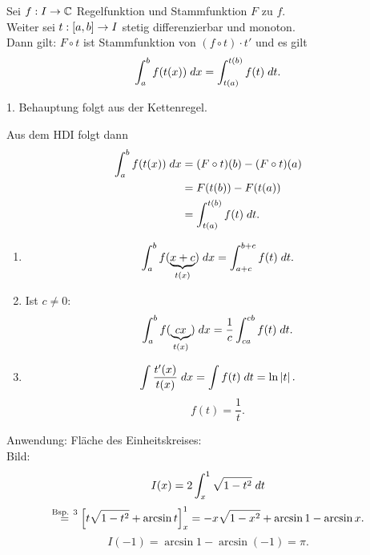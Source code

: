 \documentclass[../ana2.tex]{subfiles}
\begin{document}
\begin{satz}[Substitutionsregel]
    Sei \( \abb{f}{I}{\C} \) Regelfunktion    
    und Stammfunktion \(F\) zu \(f\).\\
    Weiter sei \( \abb{t}{[a,b]}{I} \) 
    stetig differenzierbar und monoton.\\
    Dann gilt:    
    \( F \circ t \) ist Stammfunktion von 
    \( (f\circ t) \cdot t' \)
    und es gilt 
    \[ \integral{f(t(x))}{a}{b} 
    = \integralx{f(t)}{t(a)}{t(b)}{t}. \]    
\end{satz}
\begin{bew}
    1. Behauptung folgt aus der Kettenregel.

    Aus dem HDI folgt dann
    \begin{align*}
        \integral{f(t(x))}{a}{b} 
        &= (F \circ t)(b) - (F \circ t)(a) \\
        &= F(t(b)) - F(t(a))  \\
        &= \integralx{f(t)}{t(a)}{t(b)}{t}.
    \end{align*}
\end{bew}
\begin{bspe}
    \begin{enumerate}\leavevmode
        \item \[ \integral{f(\underbrace{x+c}_{t(x)})}{a}{b} 
        = \integralx{f(t)}{a+c}{b+c}{t}. \]
        \item Ist \(c \neq 0\): 
        \[ \integral{f(\underbrace{cx}_{t(x)})}{a}{b}
        = \frac{1}{c} \integralx{f(t)}{ca}{cb}{t}. \]
        \item 
        \[ \int \frac{t'(x)}{t(x)} \;\dx{x} 
        = \int f(t) \;\dx{t} = \ln \abs{t}. \]
        \[ f(t) = \frac{1}{t}. \]
    \end{enumerate}
\end{bspe}
Anwendung:
Fläche des Einheitskreises:\\
Bild:
\[ I(x) = 2 \integralx{\sqrt{1-t^2}}{x}{1}{t} \]
\[ \oversett{Bsp. 3}{=} 
\left[ t \sqrt{1 - t^2} + \arcsin t \right]_x^1 
= - x\sqrt{1 - x^2} + \arcsin 1 - \arcsin x. \]
\[ I(-1) = \arcsin 1 - \arcsin(-1) = \pi. \]
\end{document}
